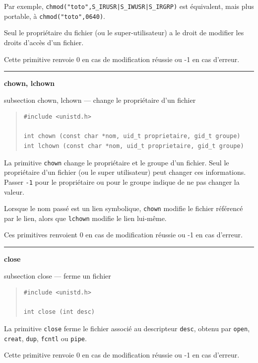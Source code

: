 \documentclass [twoside] {report}
\newcommand {\primitive} [1]
    {
	\phantomsection
	{\large \textbf {#1}}
	\addcontentsline {toc} {subsection} {#1}
    }
\newcommand {\separation}
    {
	\vspace {5mm}
	\nopagebreak
	\hrule
    }
\begin{document}
Par exemple, \verb/chmod("toto",S_IRUSR|S_IWUSR|S_IRGRP)/ est
équivalent, mais plus portable, à \verb/chmod("toto",0640)/.

Seul le propriétaire du fichier (ou le
super-utilisateur) a le droit de modifier les
droits d'accès d'un fichier.

Cette primitive renvoie 0 en cas de modification
réussie ou -1 en cas d'erreur.




\separation
\primitive {chown, lchown} --- change le propriétaire d'un fichier

\begin {quote}
\begin {verbatim}
#include <unistd.h>

int chown (const char *nom, uid_t proprietaire, gid_t groupe)
int lchown (const char *nom, uid_t proprietaire, gid_t groupe)
\end{verbatim}
\end {quote}

La primitive \texttt {chown} change le propriétaire et le groupe d'un
fichier.  Seul le propriétaire d'un fichier (ou le super utilisateur)
peut changer ces informations.  Passer \texttt {-1} pour le propriétaire
ou pour le groupe indique de ne pas changer la valeur.

Lorsque le nom passé est un lien symbolique, \texttt {chown} modifie
le fichier référencé par le lien, alors que \texttt {lchown} modifie
le lien lui-même.

Ces primitives renvoient 0 en cas de modification
réussie ou -1 en cas d'erreur.




\separation
\primitive {close} --- ferme un fichier

\begin {quote}
\begin {verbatim}
#include <unistd.h>

int close (int desc)
\end{verbatim}
\end {quote}

La primitive \texttt {close} ferme le fichier associé
au descripteur \texttt {desc}, obtenu par \texttt {open},
\texttt {creat}, \texttt {dup}, \texttt {fcntl} ou \texttt {pipe}.

Cette primitive renvoie 0 en cas de modification
réussie ou -1 en cas d'erreur.
\end{document}
